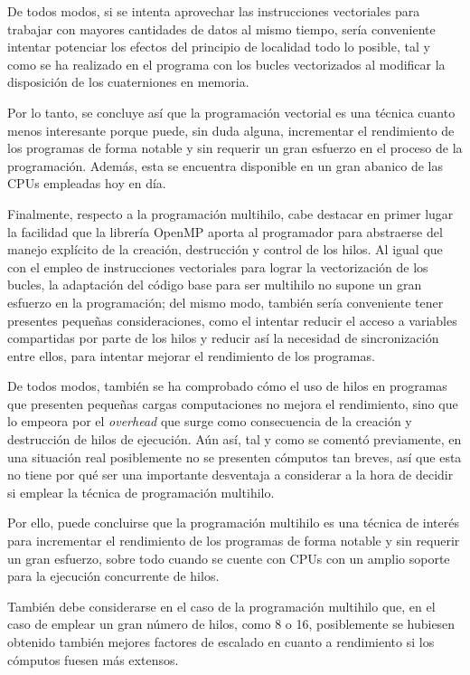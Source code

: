 \documentclass[conference]{IEEEtran}
\begin{document}
De todos modos, si se intenta aprovechar las instrucciones vectoriales para trabajar con mayores cantidades de datos al mismo tiempo, sería conveniente intentar potenciar los efectos del principio de localidad todo lo posible, tal y como se ha realizado en el programa con los bucles vectorizados al modificar la disposición de los cuaterniones en memoria.

Por lo tanto, se concluye así que la programación vectorial es una técnica cuanto menos interesante porque puede, sin duda alguna, incrementar el rendimiento de los programas de forma notable y sin requerir un gran esfuerzo en el proceso de la programación. Además, esta se encuentra disponible en un gran abanico de las CPUs empleadas hoy en día.

Finalmente, respecto a la programación multihilo, cabe destacar en primer lugar la facilidad que la librería OpenMP aporta al programador para abstraerse del manejo explícito de la creación, destrucción y control de los hilos. Al igual que con el empleo de instrucciones vectoriales para lograr la vectorización de los bucles, la adaptación del código base para ser multihilo no supone un gran esfuerzo en la programación; del mismo modo, también sería conveniente tener presentes pequeñas consideraciones, como el intentar reducir el acceso a variables compartidas por parte de los hilos y reducir así la necesidad de sincronización entre ellos, para intentar mejorar el rendimiento de los programas.

De todos modos, también se ha comprobado cómo el uso de hilos en programas que presenten pequeñas cargas computaciones no mejora el rendimiento, sino que lo empeora por el \textit{overhead} que surge como consecuencia de la creación y destrucción de hilos de ejecución. Aún así, tal y como se comentó previamente, en una situación real posiblemente no se presenten cómputos tan breves, así que esta no tiene por qué ser una importante desventaja a considerar a la hora de decidir si emplear la técnica de programación multihilo.

Por ello, puede concluirse que la programación multihilo es una técnica de interés para incrementar el rendimiento de los programas de forma notable y sin requerir un gran esfuerzo, sobre todo cuando se cuente con CPUs con un amplio soporte para la ejecución concurrente de hilos.

También debe considerarse en el caso de la programación multihilo que, en el caso de emplear un gran número de hilos, como 8 o 16, posiblemente se hubiesen obtenido también mejores factores de escalado en cuanto a rendimiento si los cómputos fuesen más extensos.
\end{document}
